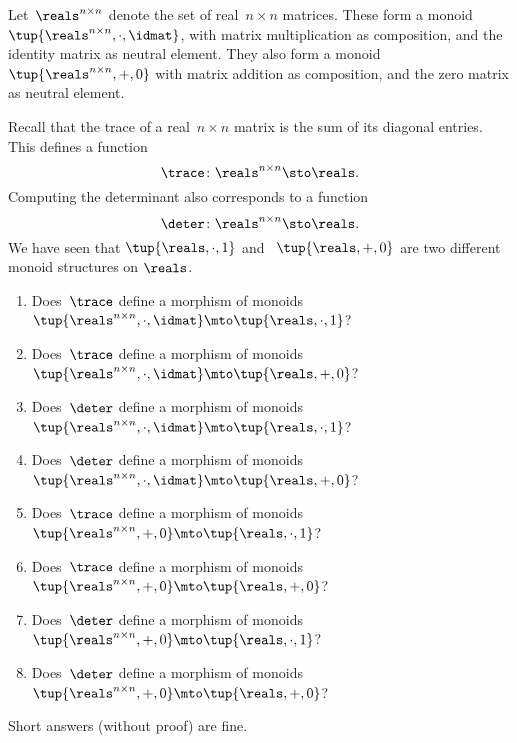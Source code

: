 \begin{gradedexercise}
  \label{ex:TraceAndDeterminant}
Let~$\reals^{n \times n}$ denote the set of real~$n \times n$ matrices. These form a monoid~$\tup{\reals^{n \times n}, \cdot, \idmat}$, with matrix multiplication as composition, and the identity matrix as neutral element. They also form a monoid $\tup{\reals^{n \times n}, + , 0}$ with matrix addition as composition, and the zero matrix as neutral element. 

Recall that the trace of a real~$n \times n$ matrix is the sum of its diagonal entries. This defines a function
\begin{equation}
\trace \colon \reals^{n \times n} \sto \reals.
\end{equation}
Computing the determinant also corresponds to a function
\begin{equation}
\deter \colon \reals^{n \times n} \sto \reals.
\end{equation}
We have seen that $\tup{ \reals, \cdot, 1}$ and ~$\tup{ \reals, +, 0}$ are two different monoid structures on $\reals$.
\begin{enumerate}
\item Does~$\trace$ define a morphism of monoids~$\tup{\reals^{n \times n}, \cdot, \idmat} \mto \tup{ \reals, \cdot, 1}$?
\item Does~$\trace$ define a morphism of monoids~$\tup{\reals^{n \times n}, \cdot, \idmat} \mto \tup{ \reals, + , 0}$?
\item Does~$\deter$ define a morphism of monoids~$\tup{\reals^{n \times n}, \cdot, \idmat} \mto \tup{ \reals, \cdot, 1}$?
\item Does~$\deter$ define a morphism of monoids~$\tup{\reals^{n \times n}, \cdot, \idmat} \mto \tup{ \reals, + , 0}$?
\item Does~$\trace$ define a morphism of monoids~$\tup{\reals^{n \times n}, +, 0} \mto \tup{ \reals, \cdot, 1}$?
\item Does~$\trace$ define a morphism of monoids~$\tup{\reals^{n \times n}, +, 0} \mto \tup{ \reals, + , 0}$?
\item Does~$\deter$ define a morphism of monoids~$\tup{\reals^{n \times n}, +, 0} \mto \tup{ \reals, \cdot, 1}$?
\item Does~$\deter$ define a morphism of monoids~$\tup{\reals^{n \times n}, +, 0} \mto \tup{ \reals, + , 0}$?
\end{enumerate}
Short answers (without proof) are fine. 
\end{gradedexercise}


